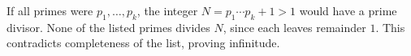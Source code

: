 If all primes were $ p_1,\ldots,p_k $, the integer $ N=p_1\cdots p_k+1>1 $ would have a prime divisor. None of the listed primes divides $ N $, since each leaves remainder $ 1 $. This contradicts completeness of the list, proving infinitude.

